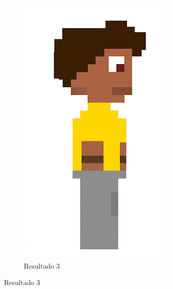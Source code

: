 \begin{figure}[htbp]
\begin{subfigure}{0.3\linewidth}
        \includegraphics[width=1\linewidth]{figs/geminiPro/chat6/tela1_res3.png}
        \caption{\small Resultado 3}
        \label{fig:geminiPro17c}
    \end{subfigure}
\end{figure}

